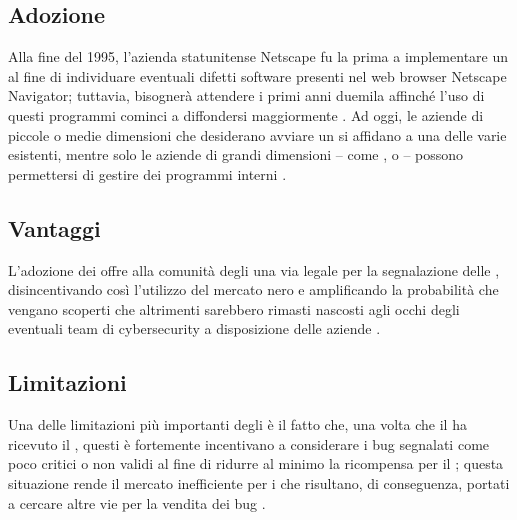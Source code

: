 \subsection{Adozione}

Alla fine del 1995, l'azienda statunitense Netscape fu la prima a implementare un \BBP al fine di individuare eventuali difetti software presenti nel web browser Netscape Navigator; tuttavia, bisognerà attendere i primi anni duemila affinché l'uso di questi programmi cominci a diffondersi maggiormente \cite{hoffman2021bountychain}.
Ad oggi, le aziende di piccole o medie dimensioni che desiderano avviare un \BBP si affidano a una delle varie \bugbountyplatform esistenti, mentre solo le aziende di grandi dimensioni -- come \GoogleBBP, \MetaBBP o {\MicrosoftBBP} -- possono permettersi di gestire dei programmi interni \cite{walshe2023bountythesis3}.


\subsection{Vantaggi}

L'adozione dei \BBP offre alla comunità degli \hacker una via legale per la segnalazione delle \vulnerability, disincentivando così l'utilizzo del mercato nero \cite{fryer2017bugbounty, walshe2020bountypaper, walshe2023bountythesis3} e amplificando la probabilità che vengano scoperti \bug che altrimenti sarebbero rimasti nascosti agli occhi degli eventuali team di cybersecurity a disposizione delle aziende \cite{walshe2020bountypaper}.

\subsection{Limitazioni}

\medskip

Una delle limitazioni più importanti degli \internalBBP è il fatto che, una volta che il \BI ha ricevuto il \bugreport, questi è fortemente incentivano a considerare i bug segnalati come poco critici o non validi al fine di ridurre al minimo la ricompensa per il \BH \cite{canidio2021verioss, akgul2023bughunters}; questa situazione rende il mercato inefficiente per i \BH che risultano, di conseguenza, portati a cercare altre vie per la vendita dei bug \cite{canidio2021verioss}.

